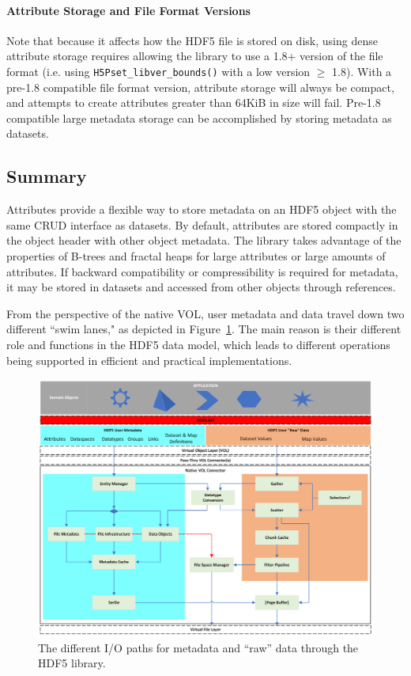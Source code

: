 \paragraph{Attribute Storage and File Format Versions}  Note that because it affects how the HDF5 file is stored on disk, using dense attribute storage requires allowing the library to use a 1.8+ version of the file format (i.e. using \texttt{H5Pset\_libver\_bounds()} with a low version $\geq$ 1.8). With a pre-1.8 compatible file format version, attribute storage will always be compact, and attempts to create attributes greater than 64KiB in size will fail. Pre-1.8 compatible large metadata storage can be accomplished by storing metadata as datasets.

\subsection{Summary} 

Attributes provide a flexible way to store metadata on an HDF5 object with the same CRUD interface as datasets. By default, attributes are stored compactly in the object header with other object metadata. The library takes advantage of the properties of B-trees and fractal heaps for large attributes or large amounts of attributes. If backward compatibility or compressibility is required for metadata, it may be stored in datasets and accessed from other objects through references.

From the perspective of the native VOL, user metadata and data travel down two different ``swim lanes," as depicted in Figure~\ref{fig:io-paths}. The main reason is their different role and functions in the HDF5 data model, which leads to different operations being supported in efficient and practical implementations.

\begin{landscape}
\begin{figure}
\centering
\includegraphics[scale=0.74,angle=90]{images/HDF5 library meta data.png}
\caption{The different I/O paths for metadata and ``raw'' data through the HDF5 library.\label{fig:io-paths}}
\end{figure}
\end{landscape}